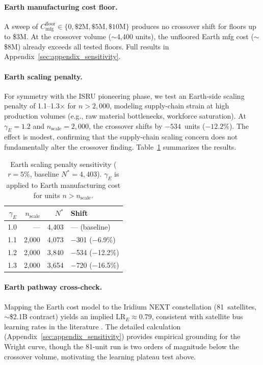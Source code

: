 \documentclass[preprint,12pt]{elsarticle}
\begin{document}
\paragraph{Earth manufacturing cost floor.} A sweep of $C_{\mathrm{mfg}}^{\mathrm{floor}} \in \{0, \$2\text{M}, \$5\text{M}, \$10\text{M}\}$ produces no crossover shift for floors up to \$3M. At the crossover volume ($\sim$4{,}400 units), the unfloored Earth mfg cost ($\sim$\$8M) already exceeds all tested floors. Full results in Appendix~\ref{sec:appendix_sensitivity}.

\paragraph{Earth scaling penalty.} For symmetry with the ISRU pioneering phase, we test an Earth-side scaling penalty of 1.1--1.3$\times$ for $n > 2{,}000$, modeling supply-chain strain at high production volumes (e.g., raw material bottlenecks, workforce saturation). At $\gamma_E = 1.2$ and $n_{\mathrm{scale}} = 2{,}000$, the crossover shifts by $-534$~units ($-12.2\%$). The effect is modest, confirming that the supply-chain scaling concern does not fundamentally alter the crossover finding. Table~\ref{tab:earth_scale} summarizes the results.

\begin{table}[htbp]
\centering
\caption{Earth scaling penalty sensitivity ($r = 5\%$, baseline $N^* = 4{,}403$). $\gamma_E$ is applied to Earth manufacturing cost for units $n > n_{\mathrm{scale}}$.}
\label{tab:earth_scale}
\small
\begin{tabular}{@{}rrrl@{}}
\toprule
$\gamma_E$ & $n_{\mathrm{scale}}$ & $N^*$ & Shift \\
\midrule
1.0 & --- & 4{,}403 & --- (baseline) \\
1.1 & 2{,}000 & 4{,}073 & $-$301 ($-$6.9\%) \\
1.2 & 2{,}000 & 3{,}840 & $-$534 ($-$12.2\%) \\
1.3 & 2{,}000 & 3{,}654 & $-$720 ($-$16.5\%) \\
\bottomrule
\end{tabular}
\end{table}

\paragraph{Earth pathway cross-check.} Mapping the Earth cost model to the Iridium NEXT constellation (81~satellites, $\sim$\$2.1B contract) yields an implied $\mathrm{LR}_E \approx 0.79$, consistent with satellite bus learning rates in the literature \cite{wertz2011}. The detailed calculation (Appendix~\ref{sec:appendix_sensitivity}) provides empirical grounding for the Wright curve, though the 81-unit run is two orders of magnitude below the crossover volume, motivating the learning plateau test above.
\end{document}
